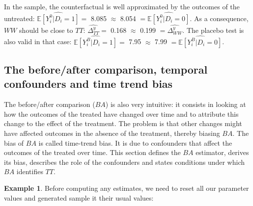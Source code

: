 \documentclass[
]{book}
\newcommand{\esp}[1]{\mathbb{E}[ #1 ]}
\theoremstyle{definition}
\theoremstyle{definition}
\newtheorem{example}{Example}[chapter]
\theoremstyle{definition}
\theoremstyle{definition}
\theoremstyle{remark}
\begin{document}
In the sample, the counterfactual is well approximated by the outcomes of the untreated: \(\hat{\esp{Y_i^0|D_i=1}}=\) 8.085 \(\approx\) 8.054 \(=\hat{\esp{Y_i^0|D_i=0}}\).
As a consequence, \(WW\) should be close to \(TT\): \(\hat{\Delta^y_{TT}}=\) 0.168 \(\approx\) 0.199 \(=\hat{\Delta^y_{WW}}\).
The placebo test is also valid in that case: \(\hat{\esp{Y_i^B|D_i=1}}=\) 7.95 \(\approx\) 7.99 \(=\hat{\esp{Y_i^B|D_i=0}}\).

\hypertarget{the-beforeafter-comparison-temporal-confounders-and-time-trend-bias}{%
\subsection{The before/after comparison, temporal confounders and time trend bias}\label{the-beforeafter-comparison-temporal-confounders-and-time-trend-bias}}

The before/after comparison (\(BA\)) is also very intuitive: it consists in looking at how the outcomes of the treated have changed over time and to attribute this change to the effect of the treatment.
The problem is that other changes might have affected outcomes in the absence of the treatment, thereby biasing \(BA\).
The bias of \(BA\) is called time-trend bias.
It is due to confounders that affect the outcomes of the treated over time.
This section defines the \(BA\) estimator, derives its bias, describes the role of the confounders and states conditions under which \(BA\) identifies \(TT\).

\begin{example}
\protect\hypertarget{exm:unnamed-chunk-23}{}{\label{exm:unnamed-chunk-23} }Before computing any estimates, we need to reset all our parameter values and generated sample it their usual values:
\end{example}
\end{document}

